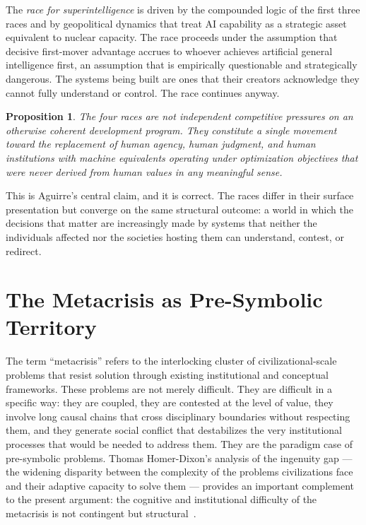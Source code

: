 \documentclass[12pt, a4paper]{article}
\newtheorem{proposition}[theorem]{Proposition}
\theoremstyle{remark}
\begin{document}
The \emph{race for superintelligence} is driven by the compounded logic of the first three races and by geopolitical dynamics that treat AI capability as a strategic asset equivalent to nuclear capacity. The race proceeds under the assumption that decisive first-mover advantage accrues to whoever achieves artificial general intelligence first, an assumption that is empirically questionable and strategically dangerous. The systems being built are ones that their creators acknowledge they cannot fully understand or control. The race continues anyway.

\begin{proposition}
The four races are not independent competitive pressures on an otherwise coherent development program. They constitute a single movement toward the replacement of human agency, human judgment, and human institutions with machine equivalents operating under optimization objectives that were never derived from human values in any meaningful sense.
\end{proposition}

This is Aguirre's central claim, and it is correct. The races differ in their surface presentation but converge on the same structural outcome: a world in which the decisions that matter are increasingly made by systems that neither the individuals affected nor the societies hosting them can understand, contest, or redirect.

\section{The Metacrisis as Pre-Symbolic Territory}

The term \enquote{metacrisis} refers to the interlocking cluster of civilizational-scale problems that resist solution through existing institutional and conceptual frameworks. These problems are not merely difficult. They are difficult in a specific way: they are coupled, they are contested at the level of value, they involve long causal chains that cross disciplinary boundaries without respecting them, and they generate social conflict that destabilizes the very institutional processes that would be needed to address them. They are the paradigm case of pre-symbolic problems. Thomas Homer-Dixon's analysis of the ingenuity gap --- the widening disparity between the complexity of the problems civilizations face and their adaptive capacity to solve them --- provides an important complement to the present argument: the cognitive and institutional difficulty of the metacrisis is not contingent but structural~\cite{HomerDixon2000}.
\end{document}
